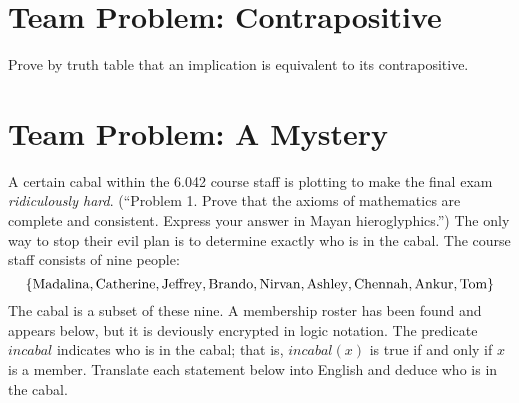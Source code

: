 \documentclass[12pt]{article}
\newcommand{\C}{\textit{incabal}}
\begin{document}


\section{Team Problem:  Contrapositive}
Prove by truth table that an implication is equivalent to its contrapositive.

\pagebreak

\section{Team Problem:  A Mystery}

A certain cabal within the 6.042 course staff is plotting to make the
final exam \textit{ridiculously hard}.  (``Problem 1.  Prove that the
axioms of mathematics are complete and consistent.  Express your
answer in Mayan hieroglyphics.'')  The only way to stop their evil plan
is to determine exactly who is in the cabal.  The course staff
consists of nine people:
%
\[
\left\{\text{Madalina}, \text{Catherine}, \text{Jeffrey}, \text{Brando}, \text{Nirvan}, \text{Ashley}, \text{Chennah}, \text{Ankur}, \text{Tom}\right\}
\]
%
The cabal is a subset of these nine.  A membership roster has been
found and appears below, but it is deviously encrypted in logic
notation.  The predicate $\C$ indicates who is in the cabal; that is,
$\C(x)$ is true if and only if $x$ is a member.  Translate each
statement below into English and deduce who is in the cabal.
\end{document}
